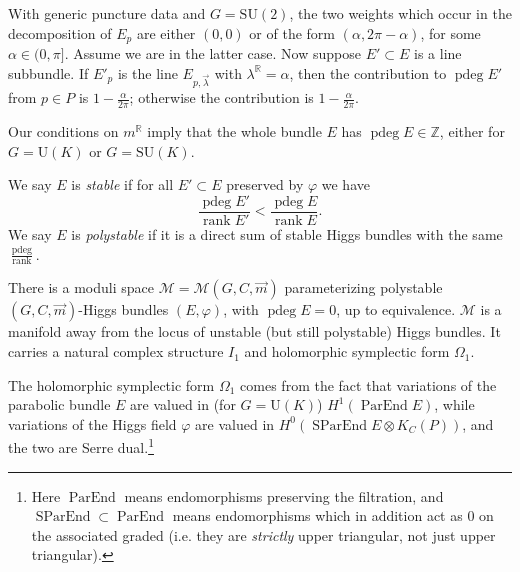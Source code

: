 \documentclass[12pt,letterpaper,reqno]{article}
\numberwithin{equation}{section}
\newcommand{\cM}{\ensuremath{\mathcal M}}
\newcommand{\R}{\ensuremath{\mathbb R}}
\newcommand{\Z}{\ensuremath{\mathbb Z}}
\newcommand{\ti}[1]{\textit{#1}}
\DeclareMathOperator{\ParEnd}{ParEnd}
\DeclareMathOperator{\SParEnd}{SParEnd}
\DeclareMathOperator{\rank}{rank}
\DeclareMathOperator{\pdeg}{pdeg}
\newcommand{\SU}{\mathrm{SU}}
\newcommand{\U}{\mathrm{U}}
\begin{document}
\begin{example}
With generic puncture data and $G = \SU(2)$,
the two weights which occur in the decomposition of 
$E_p$ are either $(0,0)$ or of the form
$(\alpha, 2\pi-\alpha)$, for some $\alpha \in (0,\pi]$.
Assume we are in the latter case.
Now suppose $E' \subset E$ is a line subbundle.
If $E'_p$ is the line 
$E_{p,\vec\lambda}$ with $\lambda^\R = \alpha$, 
then the contribution
to $\pdeg E'$ from $p \in P$ is $1 - \frac{\alpha}{2\pi}$;
otherwise
the contribution is $1 - \frac{\alpha}{2\pi}$. 
\end{example}

\begin{remark}[Integrality of $\pdeg E$] Our conditions on $m^\R$ imply that the whole bundle $E$ has $\pdeg E \in \Z$,
either for $G = \U(K)$ or $G = \SU(K)$.
\end{remark}

\begin{defn}
We say $E$ is \ti{stable} if for all $E' \subset E$ preserved
by $\varphi$ we have
\begin{equation}
  \frac{\pdeg E'}{\rank E'} < \frac{\pdeg E}{\rank E}.
\end{equation}
We say $E$ is \ti{polystable} if it is a direct sum of
stable Higgs bundles with the same $\frac{\pdeg}{\rank}$.
\end{defn}

\begin{prop}
There is a moduli space $\cM = \cM(G,C,\vec{m})$ parameterizing
polystable $(G,C,\vec{m})$-Higgs bundles $(E,\varphi)$, with $\pdeg E = 0$, 
up to equivalence. 
$\cM$ is a manifold away
from the locus of unstable (but still polystable) Higgs bundles.
It carries a natural complex structure $I_1$ and holomorphic symplectic form $\Omega_1$.
\end{prop}

The holomorphic symplectic form 
$\Omega_1$ comes from the fact that variations of the
parabolic bundle $E$ are valued in (for $G = \U(K)$)
$H^1(\ParEnd E)$,
while variations of the Higgs field $\varphi$ are
valued in $H^0(\SParEnd E \otimes K_C(P))$,
and the two are Serre dual.\footnote{Here $\ParEnd$ means
endomorphisms preserving the filtration, and $\SParEnd \subset \ParEnd$ means
endomorphisms which in addition act as $0$
on the associated graded (i.e. they are \ti{strictly} 
upper triangular, not just upper triangular).}
\end{document}
